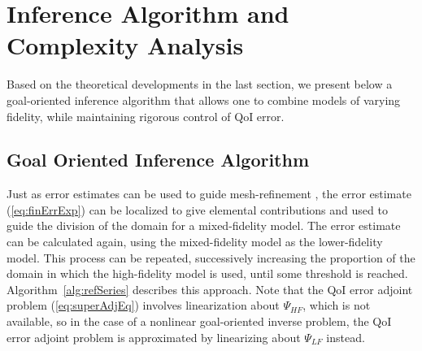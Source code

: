 \section{Inference Algorithm and Complexity Analysis}\label{sect:alg}
%
Based on the theoretical developments in the last section, we present below a goal-oriented inference algorithm that allows one to combine models of varying fidelity, while maintaining rigorous control of QoI error.
%
\subsection{Goal Oriented Inference Algorithm}
%
Just as error estimates can be used to guide mesh-refinement \cite{BecRann01}, the error estimate (\ref{eq:finErrExp}) can be localized to give elemental contributions and used to guide the division of the domain for a mixed-fidelity model. The error estimate can be calculated again, using the mixed-fidelity model as the lower-fidelity model. This process can be repeated, successively increasing the proportion of the domain in which the high-fidelity model is used, until some threshold is reached. Algorithm~\ref{alg:refSeries} describes this approach. Note that the QoI error adjoint problem (\ref{eq:superAdjEq}) involves linearization about $\Psi_{HF}$, which is not available, so in the case of a nonlinear goal-oriented inverse problem, the QoI error adjoint problem is approximated by linearizing about $\Psi_{LF}$ instead.
%
